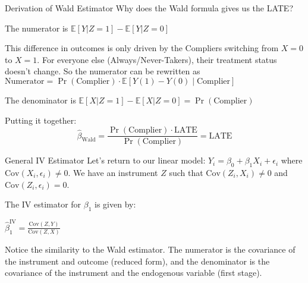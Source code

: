 \documentclass[
  ignorenonframetext,
  aspectratio=169]{beamer}
\newcommand{\E}{\mathbb{E}}
\newcommand{\Cov}{\text{Cov}}
\begin{document}
\begin{frame}{Derivation of Wald Estimator}
\label{derivation-of-wald-estimator}
Why does the Wald formula gives us the LATE?

The numerator is \(\E[Y | Z=1] - \E[Y | Z=0]\)

This difference in outcomes is only driven by the Compliers switching
from \(X=0\) to \(X=1\). For everyone else (Always/Never-Takers), their
treatment status doesn't change. So the numerator can be rewritten as
\(\text{Numerator} = \Pr(\text{Complier}) \cdot \E[Y(1) - Y(0) \mid \text{Complier}]\)

The denominator is \(\E[X | Z=1] - \E[X | Z=0] = \Pr(\text{Complier})\)

Putting it together:
\[\hat{\beta}_{\text{Wald}} = \frac{\Pr(\text{Complier}) \cdot \text{LATE}}{\Pr(\text{Complier})} = \text{LATE}\]
\end{frame}

\begin{frame}{General IV Estimator}
\label{general-iv-estimator}
Let's return to our linear model:
\(Y_i = \beta_0 + \beta_1 X_i + \epsilon_i\) where
\(\Cov(X_i, \epsilon_i) \neq 0\). We have an instrument \(Z\) such that
\(\Cov(Z_i, X_i) \neq 0\) and \(\Cov(Z_i, \epsilon_i) = 0\).

The IV estimator for \(\beta_1\) is given by:

\(\hat{\beta}_1^{\text{IV}} = \frac{\Cov(Z, Y)}{\Cov(Z, X)}\)

Notice the similarity to the Wald estimator. The numerator is the
covariance of the instrument and outcome (reduced form), and the
denominator is the covariance of the instrument and the endogenous
variable (first stage).
\end{frame}
\end{document}
